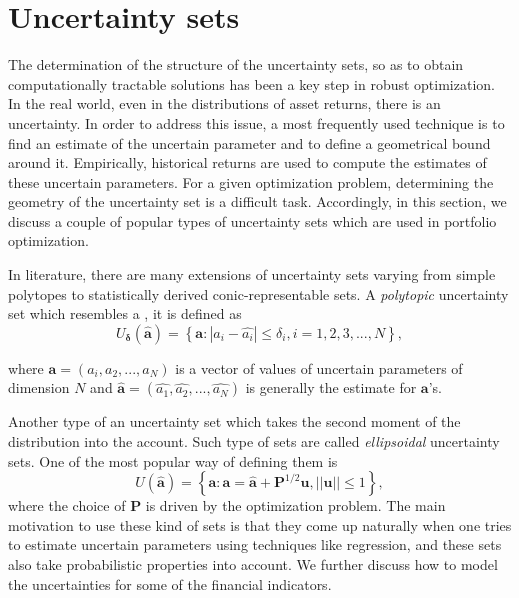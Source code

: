\documentclass[a4paper,12pt,twoside]{article}
\begin{document}
\section{Uncertainty sets}

The determination of the structure of the uncertainty sets, so as to obtain computationally tractable solutions has been a key step in robust optimization. In the real world, even in the distributions of asset returns, there is an uncertainty. In order to address this issue, a most frequently used technique is to find an estimate of the uncertain parameter and to define a geometrical bound around it. Empirically, historical returns are used to compute the estimates of these uncertain parameters. For a given optimization problem, determining the geometry of the uncertainty set is a difficult task. Accordingly, in this section, we discuss a couple of popular types of uncertainty sets which are used in portfolio optimization.

In literature, there are many extensions of uncertainty sets varying from simple polytopes to statistically derived conic-representable sets. A \textit{polytopic} \cite{fabozzi} uncertainty set which resembles a , it is defined as
\begin{equation}
\label{eqn:box}
U_{\mathbf{\delta}}(\hat{\mathbf{a}}) = \left\{ \mathbf{a} : | a_i - \hat{a_i}| \leq \delta_i, i = 1,2,3,...,N \right\},
\end{equation}

where $\mathbf{a} = (a_i, a_2, ..., a_N)$ is a vector of values of uncertain parameters of dimension $N$ and $\mathbf{\hat{a}} = (\hat{a_1}, \hat{a_2}, ... , \hat{a_N})$ is generally the estimate for $\mathbf{a}$'s.

Another type of an uncertainty set which takes the second moment of the distribution into the account. Such type of sets are called \textit{ellipsoidal} uncertainty sets. One of the most popular way of defining them is
\begin{equation}
\label{eqn:ellipse}
U(\hat{\mathbf{a}}) = \left\{ \mathbf{a} : \mathbf{a} = \hat{\mathbf{a}} + \mathbf{P}^{1/2}\mathbf{u}, ||\mathbf{u}||\leq 1 \right\},
\end{equation}
where the choice of $\mathbf{P}$ is driven by the optimization problem. The main motivation to use these kind of sets is that they come up naturally when one tries to estimate uncertain parameters using techniques like regression, and these sets also take probabilistic properties into account. We further discuss how to model the uncertainties for some of the financial indicators.
\end{document}
